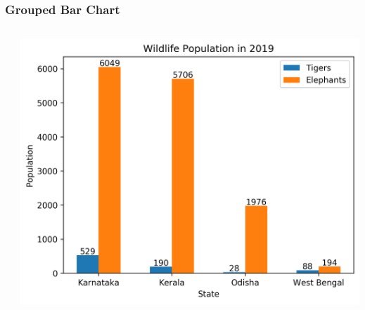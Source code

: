 \documentclass[xcolor={svgnames}]{beamer}
\newcommand{\pyfile}[2][]{}
\begin{document}
\begin{frame}[t,fragile]
    \frametitle{Grouped Bar Chart}
    \vspace{-2mm}
    \begin{columns}[T]
        \begin{column}{0.54\textwidth}
            \pyfile[style=tiny]{examples/19-bar-grouped.py}
        \end{column}
        \begin{column}{0.46\textwidth}
            \includegraphics[width=\textwidth]{img/19-bar-grouped.png}
        \end{column}
    \end{columns}
\end{frame}
\end{document}
